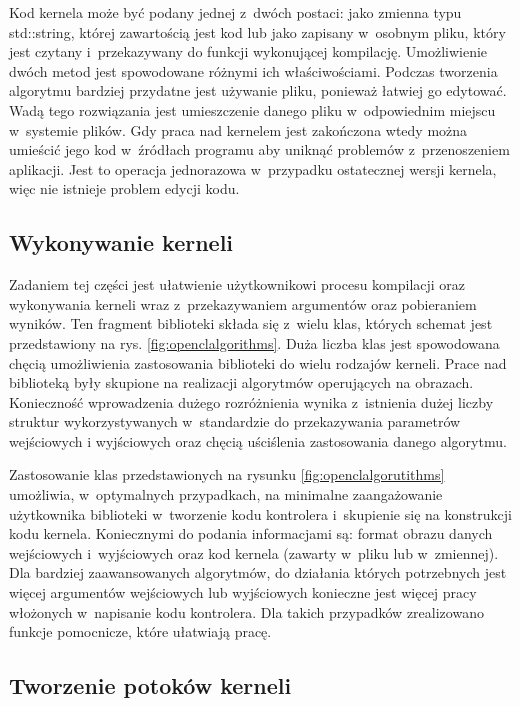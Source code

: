 Kod kernela może być podany jednej z~dwóch postaci: jako zmienna typu std::string, której zawartością jest kod lub jako zapisany w~osobnym pliku, który jest czytany i~przekazywany do funkcji wykonującej kompilację. Umożliwienie dwóch metod jest spowodowane różnymi ich właściwościami. Podczas tworzenia algorytmu bardziej przydatne jest używanie pliku, ponieważ łatwiej go edytować.  Wadą tego rozwiązania jest umieszczenie danego pliku w~odpowiednim miejscu w~systemie plików. Gdy praca nad kernelem jest zakończona wtedy można umieścić jego kod w~źródłach programu aby uniknąć problemów z~przenoszeniem aplikacji. Jest to operacja jednorazowa w~przypadku ostatecznej wersji kernela, więc nie istnieje problem edycji kodu.

\subsection{Wykonywanie kerneli}
\label{subsec:wykonywaniekerneli}
Zadaniem tej części jest ułatwienie użytkownikowi procesu kompilacji oraz wykonywania kerneli wraz z~przekazywaniem argumentów oraz pobieraniem wyników. Ten fragment biblioteki składa się z~wielu klas, których schemat jest przedstawiony na rys. \ref{fig:openclalgorithms}. Duża liczba klas jest spowodowana chęcią umożliwienia zastosowania biblioteki do wielu rodzajów kerneli. Prace nad biblioteką były skupione na realizacji algorytmów operujących na obrazach. Konieczność wprowadzenia dużego rozróżnienia wynika z~istnienia dużej liczby struktur wykorzystywanych w~standardzie do przekazywania parametrów wejściowych i wyjściowych oraz chęcią uściślenia zastosowania danego algorytmu.

Zastosowanie klas przedstawionych na rysunku \ref{fig:openclalgorutithms} umożliwia, w~optymalnych przypadkach, na minimalne zaangażowanie użytkownika biblioteki w~tworzenie kodu kontrolera i~skupienie się na konstrukcji kodu kernela. Koniecznymi do podania informacjami są: format obrazu danych wejściowych i~wyjściowych oraz kod kernela (zawarty w~pliku lub w~zmiennej). Dla bardziej zaawansowanych algorytmów, do działania których potrzebnych jest więcej argumentów wejściowych lub wyjściowych konieczne jest więcej pracy włożonych w~napisanie kodu kontrolera. Dla takich przypadków zrealizowano funkcje pomocnicze, które ułatwiają pracę.

\subsection{Tworzenie potoków kerneli}
\label{subsec:potokikerneli}

